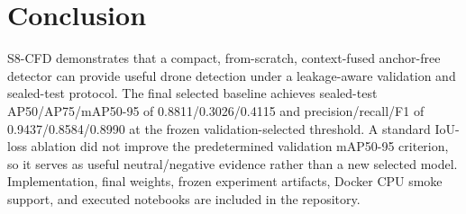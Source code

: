 \documentclass[conference]{IEEEtran}
\begin{document}
\section{Conclusion}
S8-CFD demonstrates that a compact, from-scratch, context-fused anchor-free
detector can provide useful drone detection under a leakage-aware validation and
sealed-test protocol. The final selected baseline achieves sealed-test
AP50/AP75/mAP50-95 of 0.8811/0.3026/0.4115 and precision/recall/F1 of
0.9437/0.8584/0.8990 at the frozen validation-selected threshold. A standard
IoU-loss ablation did not improve the predetermined validation mAP50-95
criterion, so it serves as useful neutral/negative evidence rather than a new
selected model. Implementation, final weights, frozen experiment artifacts,
Docker CPU smoke support, and executed notebooks are included in the repository.



\end{document}
